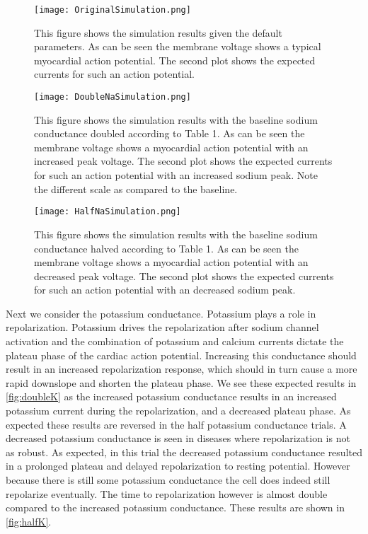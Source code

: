 \documentclass[12pt]{article}
\begin{document}
\begin{figure}[H]
	\centering
	\centering
	\texttt{[image: OriginalSimulation.png]}
	
	\caption{This figure shows the simulation results given the default parameters. As can be seen the membrane voltage shows a typical myocardial action potential. The second plot shows the expected currents for such an action potential. }
	\label{fig:baseline}
\end{figure}
\begin{figure}[H]
	\centering
	\centering
	\texttt{[image: DoubleNaSimulation.png]}
	
	\caption{This figure shows the simulation results with the baseline sodium conductance doubled according to Table 1. As can be seen the membrane voltage shows a myocardial action potential with an increased peak voltage. The second plot shows the expected currents for such an action potential with an increased sodium peak. Note the different scale as compared to the baseline. }
	\label{fig:doubleNa}
\end{figure}
\begin{figure}[H]
	\centering
	\centering
	\texttt{[image: HalfNaSimulation.png]}
	
	\caption{This figure shows the simulation results with the baseline sodium conductance halved according to Table 1. As can be seen the membrane voltage shows a myocardial action potential with an decreased peak voltage. The second plot shows the expected currents for such an action potential with an decreased sodium peak. }
	\label{fig:halfNa}
\end{figure}

\par{}
Next we consider the potassium conductance. Potassium plays a role in repolarization. Potassium drives the repolarization after sodium channel activation and the combination of potassium and calcium currents dictate the plateau phase of the cardiac action potential. Increasing this conductance should result in an increased repolarization response, which should in turn cause a more rapid downslope and shorten the plateau phase. We see these expected results in \ref{fig:doubleK} as the increased potassium conductance results in an increased potassium current during the repolarization, and a decreased plateau phase. As expected these results are reversed in the half potassium conductance trials. A decreased potassium conductance is seen in diseases where repolarization is not as robust. As expected, in this trial the decreased potassium conductance resulted in a prolonged plateau and delayed repolarization to resting potential. However because there is still some potassium conductance the cell does indeed still repolarize eventually. The time to repolarization however is almost double compared to the increased potassium conductance. These results are shown in \ref{fig:halfK}.
\end{document}
